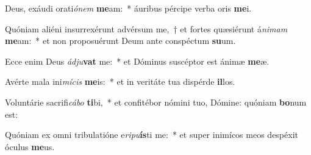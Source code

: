 \item Deus, exáudi orati\textit{ó}\textit{nem} \textbf{me}am:~* áuribus pércipe verba oris \textbf{me}i.
\item Quóniam aliéni insurrexérunt advérsum me,~† et fortes quæsiérunt á\textit{ni}\textit{mam} \textbf{me}am:~* et non proposuérunt Deum ante conspéctum \textbf{su}um.
\item Ecce enim Deus \textit{ád}\textit{ju}\textbf{vat} me:~* et Dóminus suscéptor est ánimæ \textbf{me}æ.
\item Avérte mala ini\textit{mí}\textit{cis} \textbf{me}is:~* et in veritáte tua dispérde \textbf{il}los.
\item Voluntárie sacrifi\textit{cá}\textit{bo} \textbf{ti}bi,~* et confitébor nómini tuo, Dómine: quóniam \textbf{bo}num est:
\item Quóniam ex omni tribulatióne e\textit{ri}\textit{pu}\textbf{ís}ti me:~* et super inimícos meos despéxit óculus \textbf{me}us.
